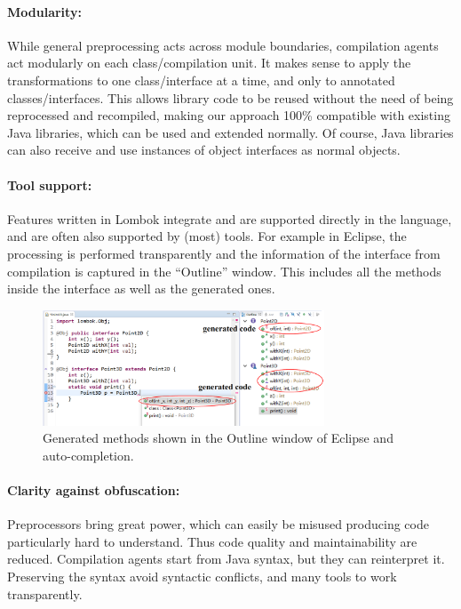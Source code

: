 \paragraph{Modularity:}
While general preprocessing acts across module boundaries, compilation
agents act modularly on each class/compilation unit. It makes sense to
apply the transformations to one class/interface at a time, and only to
annotated classes/interfaces. This allows library code to be reused
without the need of being reprocessed and recompiled, making our
approach 100\% compatible with existing Java libraries, which can be
used and extended normally. Of course, Java libraries can also receive
and use instances of object interfaces as normal objects.

\paragraph{Tool support:}
Features written in Lombok integrate and are supported directly in the
language, and are often also supported by (most) tools.  For example in Eclipse, the processing is
performed transparently and the information of the interface from
compilation is captured in the ``Outline'' window. This includes all
the methods inside the interface as well as the generated ones. 

\begin{figure}[h]
\centering
\includegraphics[width=3.3in]{pdfs/screenshot4.png}
\caption{Generated methods shown in the Outline window of Eclipse and auto-completion.}
\label{fig:screenshot}
\end{figure}

\paragraph{Clarity against obfuscation:}
Preprocessors bring great power, which can easily be misused producing
code particularly hard to understand. Thus code quality and maintainability are reduced.
Compilation agents start from Java syntax, but they can reinterpret it.
Preserving the syntax avoid syntactic conflicts, and  many
tools to work transparently.

